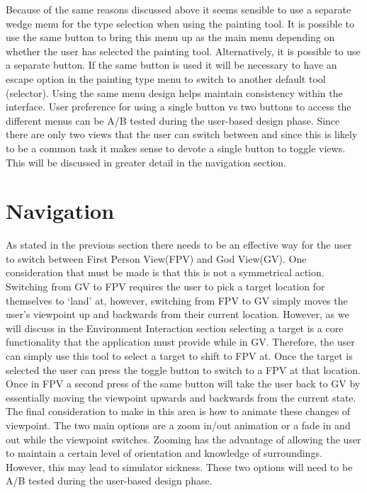 \documentclass{sig-alternate-05-2015}
\begin{document}
Because of the same reasons discussed above it seems sensible to use a separate wedge menu for the type selection when using the painting tool. It is possible to use the same button to bring this menu up as the main menu depending on whether the user has selected the painting tool. Alternatively, it is possible to use a separate button. If the same button is used it will be necessary to have an escape option in the painting type menu to switch to another default tool (selector). Using the same menu design helps maintain consistency within the interface. User preference for using a single button vs two buttons to access the different menus can be A/B tested during the user-based design phase.
Since there are only two views that the user can switch between and since this is likely to be a common task it makes sense to devote a single button to toggle views. This will be discussed in greater detail in the navigation section.

\section{Navigation}

As stated in the previous section there needs to be an effective way for the user to switch between First Person View(FPV) and God View(GV).  One consideration that must be made is that this is not a symmetrical action. Switching from GV to FPV requires the user to pick a target location for themselves to `land' at, however, switching from FPV to GV simply moves the user's viewpoint up and backwards from their current location. However, as we will discuss in the Environment Interaction section selecting a target is a core functionality that the application must provide while in GV. Therefore, the user can simply use this tool to select a target to shift to FPV at. Once the target is selected the user can press the toggle button to switch to a FPV at that location. Once in FPV a second press of the same button will take the user back to GV by essentially moving the viewpoint upwards and backwards from the current state. The final consideration to make in this area is how to animate these changes of viewpoint. The two main options are a zoom in/out animation or a fade in and out while the viewpoint switches. Zooming has the advantage of allowing the user to maintain a certain level of orientation and knowledge of surroundings. However, this may lead to simulator sickness. These two options will need to be A/B tested during the user-based design phase.
\end{document}
